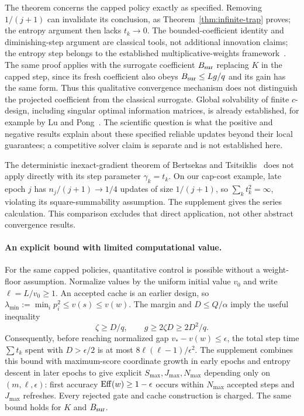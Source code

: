 \documentclass[11pt]{article}
\begin{document}
The theorem concerns the capped policy exactly as specified. Removing $1/(j+1)$ can invalidate its conclusion, as Theorem~\ref{thm:infinite-trap} proves; the entropy argument then lacks $t_k\to0$. The bounded-coefficient identity and diminishing-step argument are classical tools, not additional innovation claims; the entropy step belongs to the established multiplicative-weights framework~\cite{freund1997}. The same proof applies with the surrogate coefficient $B_{\rm sur}$ replacing $K$ in the capped step, since its fresh coefficient also obeys $B_{\rm sur}\le Lg/q$ and its gain has the same form. Thus this qualitative convergence mechanism does not distinguish the projected coefficient from the classical surrogate. Global solvability of finite $c$-design, including singular optimal information matrices, is already established, for example by Lu and Pong~\cite{lupong2013}. The scientific question is what the positive and negative results explain about these specified reliable updates beyond their local guarantees; a competitive solver claim is separate and is not established here.

The deterministic inexact-gradient theorem of Bertsekas and Tsitsiklis~\cite[Proposition~1]{bertsekas2000} does not apply directly with its step parameter $\gamma_k=t_k$. On our cap-cost example, late epoch $j$ has $n_j/(j+1)\to1/4$ updates of size $1/(j+1)$, so $\sum_k t_k^2=\infty$, violating its square-summability assumption. The supplement gives the series calculation. This comparison excludes that direct application, not other abstract convergence results.

\paragraph{An explicit bound with limited computational value.}
For the same capped policies, quantitative control is possible without a weight-floor assumption. Normalize values by the uniform initial value $v_0$ and write $\ell=L/v_0\ge1$. An accepted cache is an earlier design, so $\lambda_{\min}:=\min_i p_i^2\le v(s)\le v(w)$. The margin and $D\le Q/\alpha$ imply the useful inequality
\begin{equation}\label{eq:mismatch-progress}
 \zeta\ge D/q,\qquad g\ge2\zeta D\ge2D^2/q.
\end{equation}
Consequently, before reaching normalized gap $v_*-v(w)\le\epsilon$, the total step time $\sum t_k$ spent with $D>\epsilon/2$ is at most $8\ell(\ell-1)/\epsilon^2$.
The supplement combines this bound with maximum-score coordinate growth in early epochs and entropy descent in later epochs to give explicit $S_{\max},J_{\max},N_{\max}$ depending only on $(m,\ell,\epsilon)$: first accuracy $\operatorname{Eff}(w)\ge1-\epsilon$ occurs within $N_{\max}$ accepted steps and $J_{\max}$ refreshes. Every rejected gate and cache construction is charged. The same bound holds for $K$ and $B_{\rm sur}$.
\end{document}
